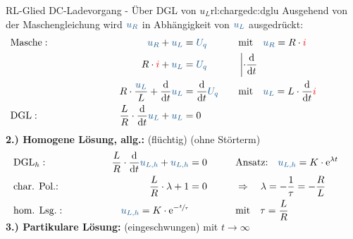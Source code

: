{\begin{bsp}{RL-Glied DC-Ladevorgang - Über DGL von $u_L$}{rl:chargedc:dglu}
    Ausgehend von der Maschengleichung wird $\ecv{u_R}$ in Abhängigkeit von $\ecv{u_L}$ ausgedrückt:%
    \begingroup%
        \addtolength{\jot}{2pt}%
    \begin{align*}
        &\text{Masche}:&&&
            \ecv{u_R} + \ecv{u_L}  &= \ecv{U_q}&&&
            &\text{mit}\quad \ecv{u_R} = R \cdot \eci{i} \\
        &&&&
            R \cdot \eci{i} + \ecv{u_L} &= \ecv{U_q} &&&
            &\left| \cdot \frac{\mathrm{d}}{\mathrm{d}t} \right. \\
        &&&&
        R \cdot \frac{\ecv{u_L}}{L}  + \frac{\mathrm{d}}{\mathrm{d}t} \ecv{u_L}  &= \frac{\mathrm{d}}{\mathrm{d}t} \ecv{U_q} &&&
            &\text{mit}\quad \ecv{u_L} = L \cdot \frac{\mathrm{d}}{\mathrm{d}t} \eci{i} \\
        &\text{DGL}:&&&
            \frac{L}{R} \cdot \frac{\mathrm{d}}{\mathrm{d}t} \ecv{u_L} + \ecv{u_L}  &= 0
            \\[-15pt]&\hphantom{R1ooooooo}&&&\hphantom{L3oooooooooooooooooooo}&\hphantom{R3ooo}&&&&\hphantom{R5oooooooooooooooooooooo}\nonumber%
        \end{align*}%
    \textbf{2.) Homogene Lösung, allg.:} (flüchtig) (ohne Störterm)%
    \begin{align*}%
        &\text{DGL}_{h}:&&&
            \frac{L}{R} \cdot \frac{\mathrm{d}}{\mathrm{d}t} \ecv{u_{L,h}} + \ecv{u_{L,h}} &= 0 &&&
                &\text{Ansatz:}\quad
                \ecv{u_{L,h}} = K \cdot \mathrm{e}^{\lambda t}\\
        &\text{char. Pol.:}&&&
            \frac{L}{R} \cdot \lambda + 1 &= 0 &&&
                &\Rightarrow\quad \lambda = -\frac{1}{\tau} = -\frac{R}{L}\\
        &\text{hom. Lsg.}:&&&
            \ecv{u_{L,h}} = K \cdot \mathrm{e}^{-\sfrac{t}{\tau}}&&&&
                &\text{mit}\quad \tau = \frac{L}{R}
    \\[-15pt]&\hphantom{R1ooooooo}&&&\hphantom{L3oooooooooooooooooooo}&\hphantom{R3ooo}&&&&\hphantom{R5oooooooooooooooooooooo}\nonumber%
    \end{align*}%
    \textbf{3.) Partikulare Lösung:} (eingeschwungen) mit $t \to \infty$%

\end{bsp}}
